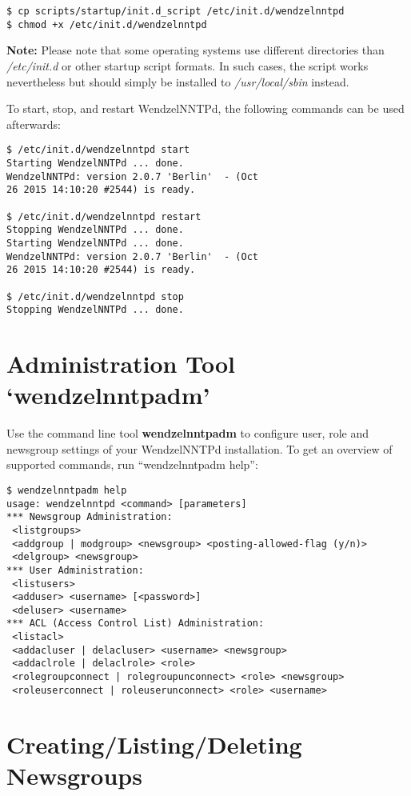\begin{verbatim}
$ cp scripts/startup/init.d_script /etc/init.d/wendzelnntpd
$ chmod +x /etc/init.d/wendzelnntpd
\end{verbatim}

\textbf{Note:} Please note that some operating systems use different directories than \textit{/etc/init.d} or other startup script formats. In such cases, the script works nevertheless but should simply be installed to \textit{/usr/local/sbin} instead.


To start, stop, and restart WendzelNNTPd, the following commands can be used afterwards:

\begin{verbatim}
$ /etc/init.d/wendzelnntpd start
Starting WendzelNNTPd ... done.
WendzelNNTPd: version 2.0.7 'Berlin'  - (Oct
26 2015 14:10:20 #2544) is ready.

$ /etc/init.d/wendzelnntpd restart
Stopping WendzelNNTPd ... done.
Starting WendzelNNTPd ... done.
WendzelNNTPd: version 2.0.7 'Berlin'  - (Oct
26 2015 14:10:20 #2544) is ready.

$ /etc/init.d/wendzelnntpd stop
Stopping WendzelNNTPd ... done.
\end{verbatim}



\section{Administration Tool `wendzelnntpadm'}

Use the command line tool \textbf{wendzelnntpadm} to configure user, role and newsgroup settings of your WendzelNNTPd installation. To get an overview of supported commands, run ``wendzelnntpadm help'':

\begin{verbatim}
$ wendzelnntpadm help
usage: wendzelnntpd <command> [parameters]
*** Newsgroup Administration:
 <listgroups>
 <addgroup | modgroup> <newsgroup> <posting-allowed-flag (y/n)>
 <delgroup> <newsgroup>
*** User Administration:
 <listusers>
 <adduser> <username> [<password>]
 <deluser> <username>
*** ACL (Access Control List) Administration:
 <listacl>
 <addacluser | delacluser> <username> <newsgroup>
 <addaclrole | delaclrole> <role>
 <rolegroupconnect | rolegroupunconnect> <role> <newsgroup>
 <roleuserconnect | roleuserunconnect> <role> <username>
\end{verbatim}

\section{Creating/Listing/Deleting Newsgroups}

